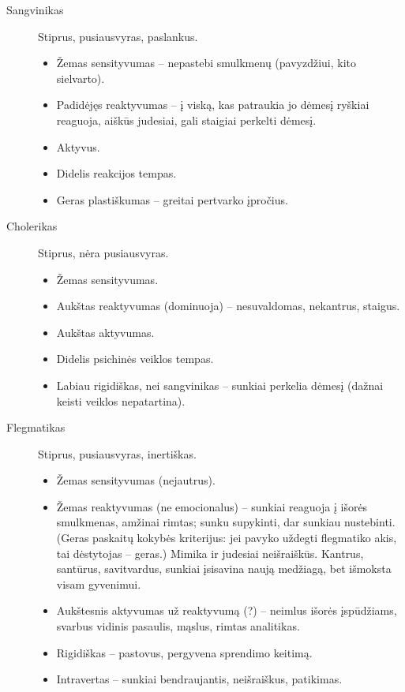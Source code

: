 \begin{description}
  \item[Sangvinikas] Stiprus, pusiausvyras, paslankus. 
    \begin{itemize}
      \item Žemas sensityvumas – nepastebi smulkmenų (pavyzdžiui, kito 
        sielvarto).
      \item Padidėjęs reaktyvumas – į viską, kas patraukia jo dėmesį ryškiai
        reaguoja, aiškūs judesiai, gali staigiai perkelti dėmesį.
      \item Aktyvus.
      \item Didelis reakcijos tempas.
      \item Geras plastiškumas – greitai pertvarko įpročius.
    \end{itemize}
  \item[Cholerikas] Stiprus, nėra pusiausvyras.
    \begin{itemize}
      \item Žemas sensityvumas.
      \item Aukštas reaktyvumas (dominuoja) – nesuvaldomas, nekantrus, 
        staigus.
      \item Aukštas aktyvumas.
      \item Didelis psichinės veiklos tempas.
      \item Labiau rigidiškas, nei sangvinikas – sunkiai perkelia dėmesį
        (dažnai keisti veiklos nepatartina).
    \end{itemize}
  \item[Flegmatikas] Stiprus, pusiausvyras, inertiškas.
    \begin{itemize}
      \item Žemas sensityvumas (nejautrus).
      \item Žemas reaktyvumas (ne emocionalus) – sunkiai reaguoja į išorės
        smulkmenas, amžinai rimtas; sunku supykinti, dar sunkiau nustebinti.
        (Geras paskaitų kokybės kriterijus: jei pavyko uždegti flegmatiko
        akis, tai dėstytojas – geras.) Mimika ir judesiai neišraiškūs.
        Kantrus, santūrus, savitvardus, sunkiai įsisavina naują medžiagą,
        bet išmoksta visam gyvenimui.
      \item Aukštesnis aktyvumas už reaktyvumą (?) – neimlus išorės 
        įspūdžiams, svarbus vidinis pasaulis, mąslus, rimtas analitikas.
      \item Rigidiškas – pastovus, pergyvena sprendimo keitimą.
      \item Intravertas – sunkiai bendraujantis, neišraiškus, patikimas.

\end{itemize}
\end{description}
